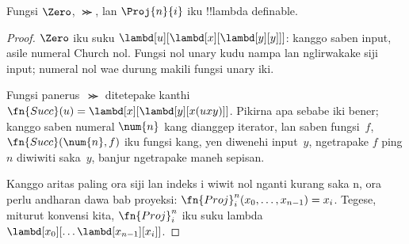 \documentclass[../../../include/open-logic-section]{subfiles}
\begin{document}

\begin{lem}
Fungsi $\Zero$, $\Succ$, lan $\Proj{n}{i}$
iku !!{lambda definable}.
\end{lem}

\begin{proof}
%
$\Zero$ iku suku
$\lambd[u][\lambd[x][\lambd[y][y]]]$:
kanggo saben input, asile numeral Church nol. Fungsi nol unary kudu nampa lan nglirwakake siji input; numeral nol wae durung makili fungsi unary iki.

Fungsi panerus~$\Succ$ ditetepake kanthi
$\fn{Succ}(u) = \lambd[x][\lambd[y][x(uxy)]]$.
Pikirna apa sebabe iki bener; kanggo saben
numeral $\num{n}$ kang dianggep iterator,
lan saben fungsi~$f$,
$\fn{Succ}(\num{n},f)$ iku fungsi kang,
yen diwenehi input~$y$, ngetrapake $f$
ping $n$ diwiwiti saka~$y$, banjur
ngetrapake maneh sepisan.

Kanggo aritas paling ora siji lan indeks i wiwit nol nganti kurang saka n, ora perlu andharan dawa bab proyeksi:
$\fn{Proj}^n_i(x_0, \dots,
x_{n-1}) = x_i$. Tegese, miturut konvensi kita,
$\fn{Proj}^n_i$ iku suku lambda
$\lambd[x_0][\dots \lambd[x_{n-1}][x_i]]$.
\end{proof}
\end{document}
